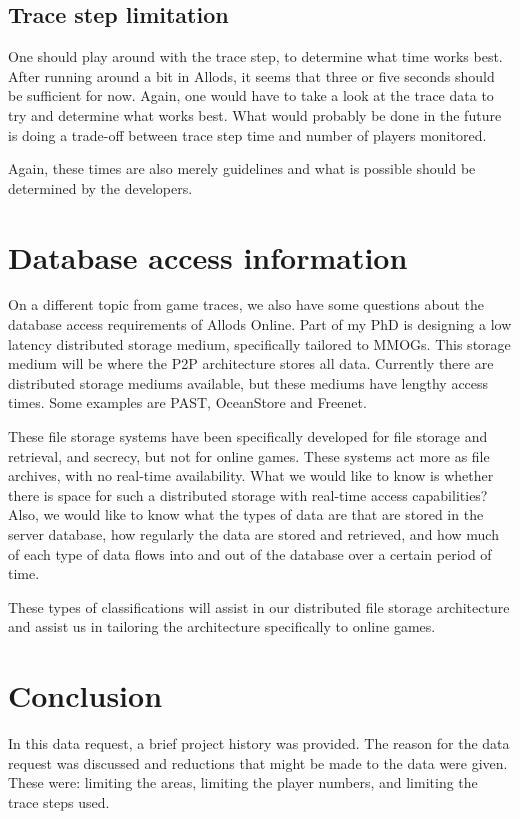 \documentclass[journal,oneside,a4paper,onecolumn]{IEEEtran}
\begin{document}
\subsection{Trace step limitation}

One should play around with the trace step, to determine what time works best. After running around a bit in Allods, it seems that three or five
seconds should be sufficient for now. Again, one would have to take a look at the trace data to try and determine what works best. What would
probably be done in the future is doing a trade-off between trace step time and number of players monitored.

Again, these times are also merely guidelines and what is possible should be determined by the developers.

\section{Database access information}

On a different topic from game traces, we also have some questions about the database access requirements of Allods Online. Part of my PhD is
designing a low latency distributed storage medium, specifically tailored to MMOGs. This storage medium will be where the P2P architecture stores all
data. Currently there are distributed storage mediums available, but these mediums have lengthy access times. Some examples are PAST, OceanStore and
Freenet.

These file storage systems have been specifically developed for file storage and retrieval, and secrecy, but not for online games. These systems act
more as file archives, with no real-time availability. What we would like to know is whether there is space for such a distributed storage with
real-time access capabilities? Also, we would like to know what the types of data are that are stored in the server database, how regularly the data
are stored and retrieved, and how much of each type of data flows into and out of the database over a certain period of time.

These types of classifications will assist in our distributed file storage architecture and assist us in tailoring the architecture specifically to
online games.

\section{Conclusion}

In this data request, a brief project history was provided. The reason for the data request was discussed and reductions that might be made to the
data were given. These were: limiting the areas, limiting the player numbers, and limiting the trace steps used.
\end{document}
